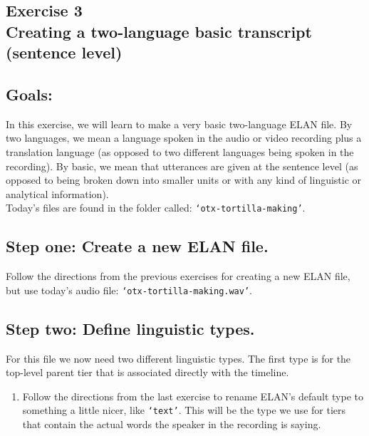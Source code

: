 \documentclass[letterpaper,12pt]{article}
\begin{document}
\begin{center}
\section*{Exercise 3\\Creating a two-language basic transcript (sentence level)}
\end{center}

\subsection*{Goals:}
\noindent In this exercise, we will learn to make a very basic two-language ELAN file. By two languages, we mean a language spoken in the audio or video recording plus a translation language (as opposed to two different languages being spoken in the recording). By basic, we mean that utterances are given at the sentence level (as opposed to being broken down into smaller units or with any kind of linguistic or analytical information).\\

\noindent Today's files are found in the folder called: \texttt{`otx-tortilla-making'}.\\

\subsection*{Step one: Create a new ELAN file.}

\noindent Follow the directions from the previous exercises for creating a new ELAN file, but use today's audio file: \texttt{`otx-tortilla-making.wav'}.

\subsection*{Step two: Define linguistic types.}
For this file we now need two different linguistic types. The first type is for the top-level parent tier that is associated directly with the timeline.

\begin{enumerate}
\item Follow the directions from the last exercise to rename ELAN's default type to something a little nicer, like \texttt{`text'}. This will be the type we use for tiers that contain the actual words the speaker in the recording is saying.
\end{enumerate}
\end{document}
